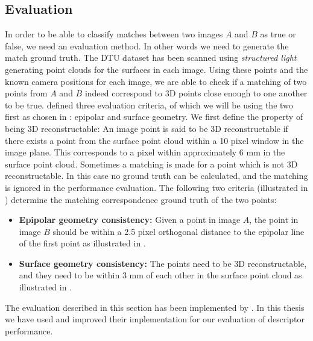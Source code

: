 \documentclass[thesis.tex]{subfiles}
\begin{document}
\subsection{Evaluation}
In order to be able to classify matches between two images $A$ and $B$ as true or false, we need an evaluation method. In other words we need to generate the match ground truth. The DTU dataset has been scanned using \emph{structured light} generating point clouds for the surfaces in each image. Using these points and the known camera positions for each image, we are able to check if a matching of two points from $A$ and $B$ indeed correspond to 3D points close enough to one another to be true. \citet{aanaes2010recall} defined three evaluation criteria, of which we will be using the two first as chosen in \citet{larsen2012in}: epipolar and surface geometry. We first define the property of being 3D reconstructable: An image point is said to be 3D reconstructable if there exists a point from the surface point cloud within a 10 pixel window in the image plane. This corresponds to a pixel within approximately 6 mm in the surface point cloud. Sometimes a matching is made for a point which is not 3D reconstructable. In this case no ground truth can be calculated, and the matching is ignored in the performance evaluation. The following two criteria (illustrated in ) determine the matching correspondence ground truth of the two points:
\begin{itemize}
	\item \textbf{Epipolar geometry consistency:} Given a point in image $A$, the point in image $B$ should be within a 2.5 pixel orthogonal distance to the epipolar line of the first point as illustrated in .
	\item \textbf{Surface geometry consistency:} The points need to be 3D reconstructable, and they need to be within 3 mm of each other in the surface point cloud as illustrated in .
\end{itemize}
The evaluation described in this section has been implemented by \citet{aanaes2010recall}. In this thesis we have used and improved their implementation for our evaluation of descriptor performance.
\end{document}
